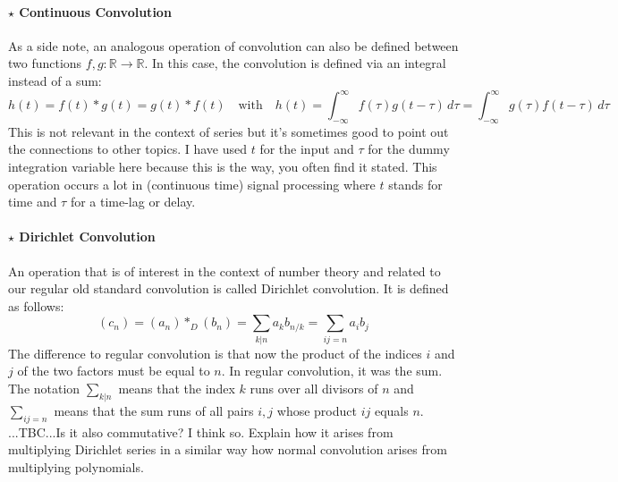 \paragraph{$\star$ Continuous Convolution}
As a side note, an analogous operation of convolution can also be defined between two functions $f,g: \mathbb{R} \rightarrow \mathbb{R}$. In this case, the convolution is defined via an integral instead of a sum:
\begin{equation}
 h(t) = f(t) \ast g(t) = g(t) \ast f(t) \quad \text{with} \quad
 h(t) = \int_{-\infty}^{\infty} f(\tau) g(t-\tau) \, d \tau 
      = \int_{-\infty}^{\infty} g(\tau) f(t-\tau) \, d \tau
\end{equation}
This is not relevant in the context of series but it's sometimes good to point out the connections to other topics. I have used $t$ for the input and $\tau$ for the dummy integration variable here because this is the way, you often find it stated. This operation occurs a lot in (continuous time) signal processing where $t$ stands for time and $\tau$ for a time-lag or delay.

\paragraph{$\star$ Dirichlet Convolution}
An operation that is of interest in the context of number theory and related to our regular old standard convolution is called Dirichlet convolution. It is defined as follows: 
\begin{equation}
 (c_n) = (a_n) \ast_D (b_n) 
       = \sum_{k | n} a_k b_{n/k} 
       = \sum_{ij = n} a_i b_j 
\end{equation}
The difference to regular convolution is that now the product of the indices $i$ and $j$ of the two factors must be equal to $n$. In regular convolution, it was the sum. The notation $\sum_{k | n}$ means that the index $k$ runs over all divisors of $n$ and $\sum_{ij = n}$ means that the sum runs of all pairs $i,j$ whose product $ij$ equals $n$. ...TBC...Is it also commutative? I think so. Explain how it arises from multiplying Dirichlet series in a similar way how normal convolution arises from multiplying polynomials. 






